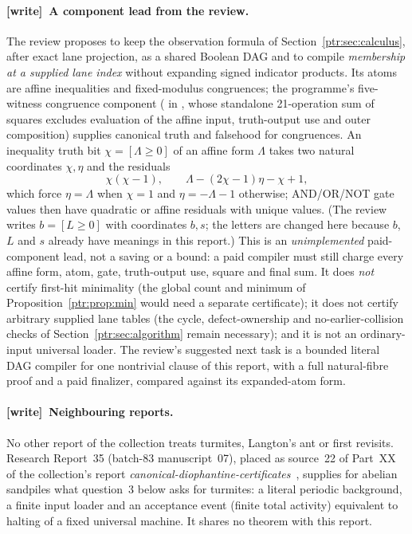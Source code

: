 \documentclass[11pt,letterpaper]{article}
\theoremstyle{definition}\newtheorem{definition}[theorem]{Definition}
\theoremstyle{remark}\newtheorem{remark}[theorem]{Remark}
\newcommand{\wtag}{\textup{[write]}}
\begin{document}
{\paragraph{\wtag\ A component lead from the review.} The review proposes to
keep the observation formula of Section~\ref{ptr:sec:calculus}, after exact
lane projection, as a shared Boolean DAG and to compile \emph{membership at
a supplied lane index} without expanding signed indicator products. Its
atoms are affine inequalities and fixed-modulus congruences; the
programme's five-witness congruence component
( in
,
whose standalone 21-operation sum of squares excludes evaluation of the
affine input, truth-output use and outer composition) supplies canonical
truth and falsehood for congruences. An inequality truth bit $\chi=[\Lambda\ge0]$
of an affine form $\Lambda$ takes two natural coordinates $\chi,\eta$
and the residuals
\[
 \chi(\chi-1),\qquad \Lambda-(2\chi-1)\eta-\chi+1,
\]
which force $\eta=\Lambda$ when $\chi=1$ and $\eta=-\Lambda-1$
otherwise; AND/OR/NOT gate values then have quadratic or affine residuals
with unique values. (The review writes $b=[L\ge0]$ with coordinates $b,s$;
the letters are changed here because $b$, $L$ and $s$ already have
meanings in this report.) This is an \emph{unimplemented} paid-component
lead, not a saving or a bound: a paid compiler must still charge every
affine form, atom, gate, truth-output use, square and final sum. It does
\emph{not} certify first-hit minimality (the global count and minimum of
Proposition~\ref{ptr:prop:min} would need a separate certificate); it does
not certify arbitrary supplied lane tables (the cycle, defect-ownership and
no-earlier-collision checks of Section~\ref{ptr:sec:algorithm} remain
necessary); and it is not an ordinary-input universal loader. The review's
suggested next task is a bounded literal DAG compiler for one nontrivial
clause of this report, with a full natural-fibre proof and a paid
finalizer, compared against its expanded-atom form.

\paragraph{\wtag\ Neighbouring reports.} No other report of the collection
treats turmites, Langton's ant or first revisits. Research Report~35
(batch-83 manuscript~07), placed as source~22 of Part~XX of the collection's
report \emph{canonical-diophantine-certificates}~\cite{cdcreport}, supplies
for abelian sandpiles what question~3 below asks for turmites: a literal
periodic background, a finite input loader and an acceptance event (finite
total activity) equivalent to halting of a fixed universal machine. It
shares no theorem with this report.

}
\end{document}

